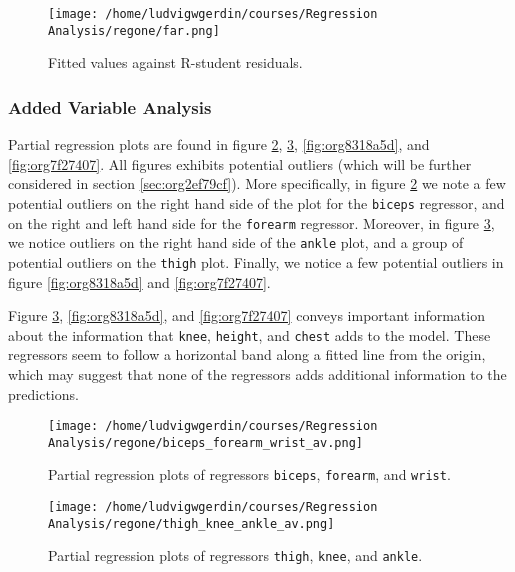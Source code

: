 \documentclass[11pt]{article}
\begin{document}
\begin{figure}[htbp]
\centering
\texttt{[image: /home/ludvigwgerdin/courses/Regression Analysis/regone/far.png]}
\caption{\label{fig:org6418d98}
Fitted values against R-student residuals.}
\end{figure}

\subsubsection{Added Variable Analysis}
\label{sec:org5420652}

Partial regression plots are found in figure \ref{fig:orgd5f74db}, \ref{fig:org77eabbe},
\ref{fig:org8318a5d}, and \ref{fig:org7f27407}. All figures exhibits potential outliers 
(which will be further considered in section \ref{sec:org2ef79cf}).
More specifically, in figure \ref{fig:orgd5f74db} we note a 
few potential outliers on the right hand side of the plot for the \texttt{biceps} regressor, and on the
right and left hand side for the \texttt{forearm} regressor. Moreover, in figure \ref{fig:org77eabbe}, we 
notice outliers on the right hand side of the \texttt{ankle} plot, and a group of potential outliers on the
\texttt{thigh} plot. Finally, we notice a few potential outliers in figure \ref{fig:org8318a5d} and 
\ref{fig:org7f27407}.

Figure \ref{fig:org77eabbe}, \ref{fig:org8318a5d}, and \ref{fig:org7f27407} 
conveys important information about the information that \texttt{knee}, \texttt{height}, and
\texttt{chest} adds to the model. These regressors seem to follow a horizontal band along a fitted 
line from the origin, which may suggest that none of the regressors adds additional information 
to the predictions.

\begin{figure}[htbp]
\centering
\texttt{[image: /home/ludvigwgerdin/courses/Regression Analysis/regone/biceps\_forearm\_wrist\_av.png]}
\caption{\label{fig:orgd5f74db}
Partial regression plots of regressors \texttt{biceps}, \texttt{forearm}, and \texttt{wrist}.}
\end{figure}   

\begin{figure}[htbp]
\centering
\texttt{[image: /home/ludvigwgerdin/courses/Regression Analysis/regone/thigh\_knee\_ankle\_av.png]}
\caption{\label{fig:org77eabbe}
Partial regression plots of regressors \texttt{thigh}, \texttt{knee}, and \texttt{ankle}.}
\end{figure}
\end{document}

